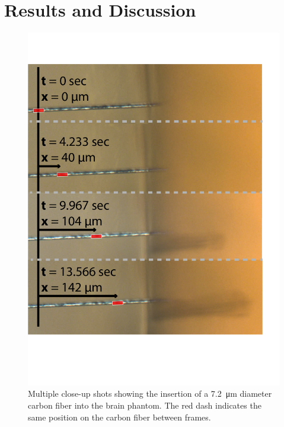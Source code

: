 \section{Results and Discussion}

\begin{figure}[]
    \centering
    \includegraphics[width=0.8\columnwidth]{images/ProgressionCuts.png}
    \vspace{-1.1cm}
    \caption{Multiple close-up shots showing the insertion of a \SI{7.2}{\micro\meter} diameter carbon fiber into the brain phantom. The red dash indicates the same position on the carbon fiber between frames.}
    \label{fig:agar-push-frames}
\end{figure}



